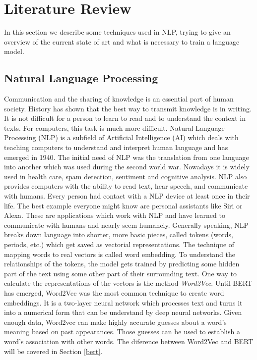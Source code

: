 \chapter{Literature Review} \label{chapter:literaturereview}
In this section we describe some techniques used in NLP, trying to give an overview of the current state of art and what is necessary to train a language model.

\section{Natural Language Processing}
\alert{Communication and the sharing of knowledge is an essential part of human society. History has shown that the best way to transmit knowledge is in writing. It is not difficult for a person to learn to read and to understand the context in texts. For computers, this task is much more difficult. Natural Language Processing (NLP) is a subfield of Artificial Intelligence (AI) which deals with teaching computers to understand and interpret human language and has emerged in 1940. The initial need of NLP was the translation from one language into another which was used during the second world war. Nowadays it is widely used in health care, spam detection, sentiment and cognitive analysis. NLP also provides computers with the ability to read text, hear speech, and communicate with humans. Every person had contact with a NLP device at least once in their life. The best example everyone might know are personal assistants like Siri or Alexa. These are applications which work with NLP and have learned to communicate with humans and nearly seem humanely.\newline
Generally speaking, NLP breaks down language into shorter, more basic pieces, called tokens (words, periods, etc.) which get saved as vectorial representations. The technique of mapping words to real vectors is called word embedding. To understand the relationships of the tokens, the model gets trained by predicting some hidden part of the text using some other part of their surrounding text. One way to calculate the representations of the vectors is the method \textit{Word2Vec}. Until BERT has emerged, Word2Vec was the most common technique to create word embeddings. It is a two-layer neural network which processes text and turns it into a numerical form that can be understand by deep neural networks. Given enough data, Word2vec can make highly accurate guesses about a word’s meaning based on past appearances. Those guesses can be used to establish a word’s association with other words. The diference between Word2Vec and BERT will be covered in Section \ref{bert}}.

